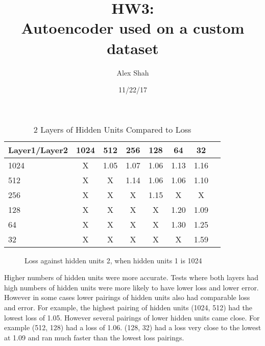 \documentclass[10pt,a4paper]{article}
\begin{document}
\title{HW3: \\ Autoencoder used on a custom dataset}
\author{Alex Shah}
\date{11/22/17}

\maketitle

\begin{table}[h]
 \caption{2 Layers of Hidden Units Compared to Loss}
 \label{tbl:aTable}
 \begin{center}
  \begin{tabular}{lccccccr}
    \hline 
    Layer1/Layer2 & 1024 & 512 & 256 & 128 & 64 & 32  \\
    \hline
	1024 & X & 1.05 & 1.07 & 1.06 & 1.13 & 1.16 \\
	512  & X & X    & 1.14 & 1.06 & 1.06 & 1.10 \\
	256  & X & X    & X    & 1.15 & X    & X    \\
	128  & X & X    & X    & X    & 1.20 & 1.09 \\
	64   & X & X    & X    & X    & 1.30 & 1.25 \\
	32   & X & X    & X    & X    & X    & 1.59 \\
    \hline 
  \end{tabular}
 \end{center}
\end{table}

\begin{figure}[h]
\begin{center}
	\caption{Loss against hidden units 2, when hidden units 1 is 1024}
\end{center}
\end{figure}

	Higher numbers of hidden units were more accurate. Tests where both layers had high numbers of hidden units were more likely to have lower loss and lower error. However in some cases lower pairings of hidden units also had comparable loss and error. For example, the highest pairing of hidden units (1024, 512) had the lowest loss of 1.05. However several pairings of lower hidden units came close. For example (512, 128) had a loss of 1.06. (128, 32) had a loss very close to the lowest at 1.09 and ran much faster than the lowest loss pairings.
\end{document}
